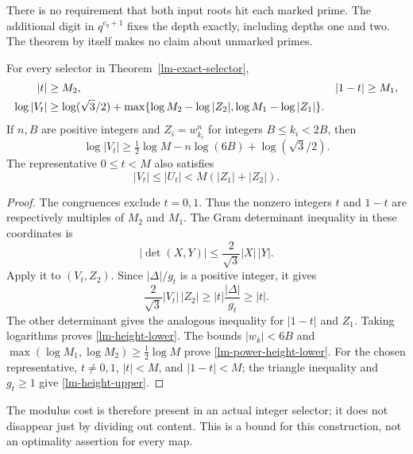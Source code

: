 There is no requirement that both input roots hit each marked prime.
The additional digit in \(q^{e_q+1}\) fixes the depth exactly,
including depths one and two. The theorem by itself makes no claim
about unmarked primes.

\begin{proposition}
\label{lm-primitive-height}
For every selector in Theorem~\ref{lm-exact-selector},
\begin{align}
 |t|&\ge M_2,& |1-t|&\ge M_1,\notag\\
 \log|V_t|&\ge\log(\sqrt3/2)
       +\max\{\log M_2-\log|Z_2|,
                  \log M_1-\log|Z_1|\}.
 \label{lm-height-lower}
\end{align}
If \(n,B\) are positive integers and \(Z_i=w_{k_i}^n\) for integers
\(B\le k_i<2B\), then
\begin{equation}
 \log|V_t|\ge\tfrac12\log M-n\log(6B)+\log(\sqrt3/2).
 \label{lm-power-height-lower}
\end{equation}
The representative \(0\le t<M\) also satisfies
\begin{equation}
 |V_t|\le |U_t|<M(|Z_1|+|Z_2|).
 \label{lm-height-upper}
\end{equation}
\end{proposition}
\begin{proof}
The congruences exclude \(t=0,1\). Thus the nonzero integers \(t\)
and \(1-t\) are respectively multiples of \(M_2\) and \(M_1\).
The Gram determinant inequality in these coordinates is
\[
 |\det(X,Y)|\le \frac2{\sqrt3}|X|\,|Y|.
\]
Apply it to \((V_t,Z_2)\). Since \(|\Delta|/g_t\) is a positive
integer, it gives
\[
 \frac2{\sqrt3}|V_t|\,|Z_2|
     \ge |t|\frac{|\Delta|}{g_t}\ge |t|.
\]
The other determinant gives the analogous inequality for
\(|1-t|\) and \(Z_1\). Taking logarithms proves
\eqref{lm-height-lower}. The bounds \(|w_k|<6B\) and
\(\max(\log M_1,\log M_2)\ge\tfrac12\log M\) prove
\eqref{lm-power-height-lower}. For the chosen representative,
\(t\ne0,1\), \(|t|<M\), and \(|1-t|<M\); the triangle
inequality and \(g_t\ge1\) give \eqref{lm-height-upper}.
\end{proof}

The modulus cost is therefore present in an actual integer selector;
it does not disappear just by dividing out content. This is a bound
for this construction, not an optimality assertion for every map.

